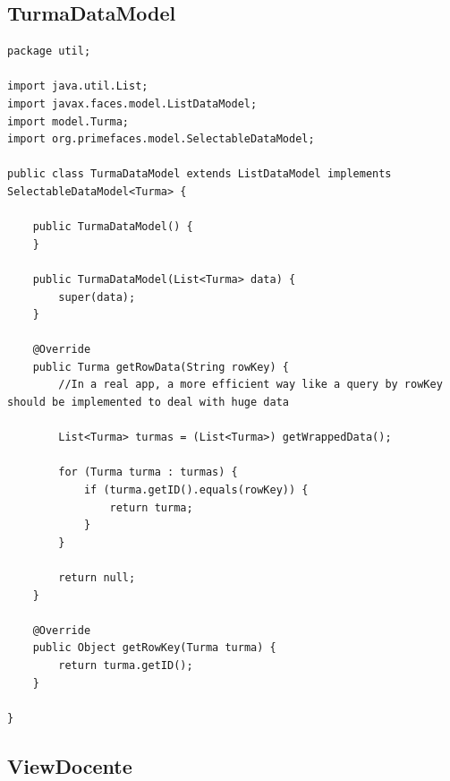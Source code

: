 \documentclass[12pt,a4paper]{article}
\begin{document}
\subsection{TurmaDataModel}
\label{subsectionTurmaDataModel}
\begin{lstlisting}
package util;

import java.util.List;
import javax.faces.model.ListDataModel;
import model.Turma;
import org.primefaces.model.SelectableDataModel;

public class TurmaDataModel extends ListDataModel implements SelectableDataModel<Turma> {

    public TurmaDataModel() {
    }

    public TurmaDataModel(List<Turma> data) {
        super(data);
    }

    @Override
    public Turma getRowData(String rowKey) {
        //In a real app, a more efficient way like a query by rowKey should be implemented to deal with huge data  

        List<Turma> turmas = (List<Turma>) getWrappedData();

        for (Turma turma : turmas) {
            if (turma.getID().equals(rowKey)) {
                return turma;
            }
        }

        return null;
    }

    @Override
    public Object getRowKey(Turma turma) {
        return turma.getID();
    }

}
\end{lstlisting}

\lstset{language=HTML}
\subsection{ViewDocente}
\end{document}
